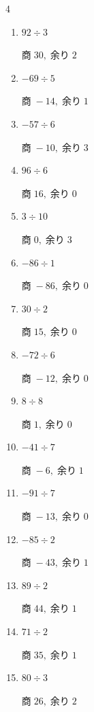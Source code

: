 \begin{multicols}{4}
\begin{enumerate}
        $商\; -13,\; 余り\; 1$

  \item $92 \div 3$

        $商\; 30,\; 余り\; 2$

  \item $-69 \div 5$

        $商\; -14,\; 余り\; 1$

  \item $-57 \div 6$

        $商\; -10,\; 余り\; 3$

  \item $96 \div 6$

        $商\; 16,\; 余り\; 0$

  \item $3 \div 10$

        $商\; 0,\; 余り\; 3$

  \item $-86 \div 1$

        $商\; -86,\; 余り\; 0$

  \item $30 \div 2$

        $商\; 15,\; 余り\; 0$

  \item $-72 \div 6$

        $商\; -12,\; 余り\; 0$

  \item $8 \div 8$

        $商\; 1,\; 余り\; 0$

  \item $-41 \div 7$

        $商\; -6,\; 余り\; 1$

  \item $-91 \div 7$

        $商\; -13,\; 余り\; 0$

  \item $-85 \div 2$

        $商\; -43,\; 余り\; 1$

  \item $89 \div 2$

        $商\; 44,\; 余り\; 1$

  \item $71 \div 2$

        $商\; 35,\; 余り\; 1$

  \item $80 \div 3$

        $商\; 26,\; 余り\; 2$


\end{enumerate}
\end{multicols}
